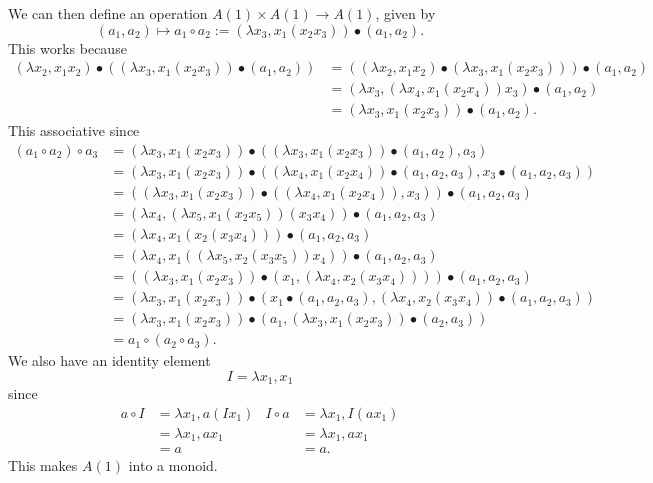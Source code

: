 \documentclass{amsbook}
\theoremstyle{definition}
\begin{document}
  We can then define an operation $ A(1) \times A(1) \to A(1) $, given by
  \[ (a_1, a_2) \mapsto a_1 \circ a_2 := (\lambda x_3, x_1 (x_2 x_3)) \bullet (a_1, a_2). \]
  This works because
  \begin{align*}
    (\lambda x_2, x_1 x_2) \bullet ((\lambda x_3, x_1 (x_2 x_3)) \bullet (a_1, a_2))
    &= ((\lambda x_2, x_1 x_2) \bullet (\lambda x_3, x_1 (x_2 x_3))) \bullet (a_1, a_2)\\
    &= (\lambda x_3, (\lambda x_4, x_1 (x_2 x_4)) x_3) \bullet (a_1, a_2)\\
    &= (\lambda x_3, x_1 (x_2 x_3)) \bullet (a_1, a_2).
  \end{align*}
  This associative since
  \begin{align*}
    (a_1 \circ a_2) \circ a_3
    &= (\lambda x_3, x_1 (x_2 x_3)) \bullet ((\lambda x_3, x_1 (x_2 x_3)) \bullet (a_1, a_2), a_3)\\
    &= (\lambda x_3, x_1 (x_2 x_3)) \bullet ((\lambda x_4, x_1 (x_2 x_4)) \bullet (a_1, a_2, a_3), x_3 \bullet (a_1, a_2, a_3))\\
    &= ((\lambda x_3, x_1 (x_2 x_3)) \bullet ((\lambda x_4, x_1 (x_2 x_4)), x_3)) \bullet (a_1, a_2, a_3)\\
    &= (\lambda x_4, (\lambda x_5, x_1 (x_2 x_5)) (x_3 x_4)) \bullet (a_1, a_2, a_3)\\
    &= (\lambda x_4, x_1 (x_2 (x_3 x_4))) \bullet (a_1, a_2, a_3)\\
    &= (\lambda x_4, x_1 ((\lambda x_5, x_2 (x_3 x_5)) x_4)) \bullet (a_1, a_2, a_3)\\
    &= ((\lambda x_3, x_1 (x_2 x_3)) \bullet (x_1, (\lambda x_4, x_2 (x_3 x_4)))) \bullet (a_1, a_2, a_3)\\
    &= (\lambda x_3, x_1 (x_2 x_3)) \bullet (x_1 \bullet (a_1, a_2, a_3), (\lambda x_4, x_2 (x_3 x_4)) \bullet (a_1, a_2, a_3))\\
    &= (\lambda x_3, x_1 (x_2 x_3)) \bullet (a_1, (\lambda x_3, x_1 (x_2 x_3)) \bullet (a_2, a_3))\\
    &= a_1 \circ (a_2 \circ a_3).
  \end{align*}
  We also have an identity element
  \[ I = \lambda x_1, x_1 \]
  since
  \begin{align*}
    a \circ I &= \lambda x_1, a (I x_1) & I \circ a &= \lambda x_1, I (a x_1)\\
    &= \lambda x_1, a x_1&
    &= \lambda x_1, a x_1\\
    &= a&
    &= a.
  \end{align*}
  This makes $ A(1) $ into a monoid.
\end{document}
